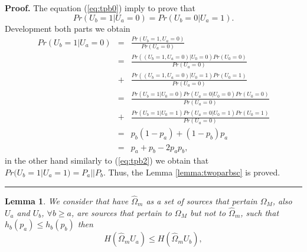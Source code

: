 \documentclass[a4paper,10pt]{article}
\newtheorem{mylemma}[mytheorem]{Lemma}
\newenvironment{myproof}[1][Proof]{\textbf{#1.} }{\ \rule{0.5em}{0.5em}}
\begin{document}
\begin{myproof}
\label{proof:twoparbsc}
The equation (\ref{eq:tpb0}) imply to prove that 
\begin{equation} \label{eq:tpb1}
Pr(U_b=1|U_a=0)=Pr(U_b=0|U_a=1).
\end{equation}
Development both parts we obtain
\small
\begin{equation} \label{eq:tpb2}
\begin{matrix}
Pr(U_b=1|U_a=0) & = & \frac{Pr(U_b=1,U_a=0)}{Pr(U_a=0)}\\ 
 ~              & = & \frac{Pr((U_b=1,U_a=0)|U_0=0)Pr(U_0=0)}{Pr(U_a=0)}\\ 
 ~              & + & \frac{Pr((U_b=1,U_a=0)|U_0=1)Pr(U_0=1)}{Pr(U_a=0)}\\
 ~              & = & \frac{Pr(U_b=1|U_0=0)Pr(U_a=0|U_0=0)Pr(U_0=0)}{Pr(U_a=0)}\\ 
 ~              & + & \frac{Pr(U_b=1|U_0=1)Pr(U_a=0|U_0=1)Pr(U_0=1)}{Pr(U_a=0)}\\
 ~              & = & p_b(1-p_a)+(1-p_b)p_a\\ 
 ~              & = & p_a+p_b -2 p_a p_b,
\end{matrix}
\end{equation}
\normalsize
in the other hand similarly to (\ref{eq:tpb2}) we obtain that 
$Pr(U_b=1|U_a=1)=P_a || P_b$. Thus, the Lemma \ref{lemma:twoparbsc} is proved.
\end{myproof}
\begin{mdframed}[style=MDFStyGrayScreen]
\begin{mylemma}
\label{lemma:minimo}
We consider that have $\hat{\Omega}_{m}$ as a set of sources that pertain 
$\Omega_M$, also $U_{a}$ and $U_b$, $\forall b \geq {a}$, are sources that 
pertain to $\Omega_M$ but not to $\hat{\Omega}_{m}$, such that $ h_b(p_a) \leq h_b(p_b)$
then
\begin{equation}\label{eq:proof1}
 H(\hat{\Omega}_{m} U_{a} ) \leq H(\hat{\Omega}_{m} U_b ),
\end{equation}
\end{mylemma}
\end{mdframed}
\end{document}

